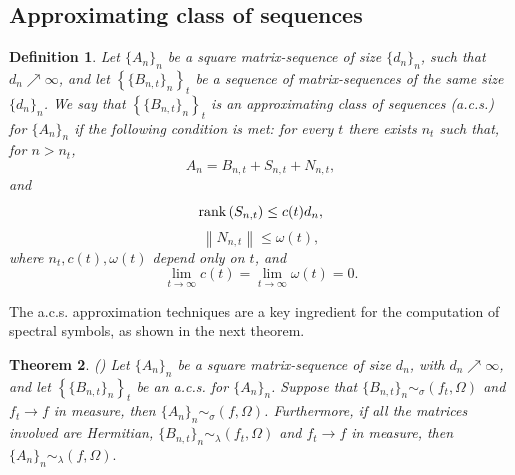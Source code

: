 \documentclass{amsart}
\newtheorem{thm}{Theorem}[section]
\newtheorem{defn}[thm]{Definition}
\begin{document}
\subsection{Approximating class of sequences}

\begin{defn}\label{def_acs}
Let $\{A_{n}\}_n$ be a square matrix-sequence of size $\{d_n\}_n$, such that $ d_n \nearrow \infty $, and let $\left\{\{B_{n,t}\}_n\right\}_{t}$ be a sequence of matrix-sequences of the same size $\{d_n\}_n$. We say that $\left\{\{B_{n,t}\}_n\right\}_{t}$ is an approximating class of sequences (a.c.s.) for $\{A_{n}\}_n$ %
if the following condition is met: for every $t$ there exists $n_t$ such that, for $n>n_t$,
\begin{equation*} \nonumber
A_n =  B_{n,t} + S_{n,t} + N_{n,t},
\end{equation*}
and
\begin{equation*}
    \textnormal{rank}\left(S_{n,t}\right) \leq c(t) d_n,
\end{equation*}
$$
\left\|N_{n,t}\right\|\leq \omega(t),
$$
where $n_t, c(t), \omega(t)$ depend only on $t$, and
$$
\lim_{t \to \infty} c(t) = \lim_{t \to \infty} \omega(t) =0.
$$
\end{defn}

The a.c.s. approximation techniques are a key ingredient for the computation of spectral symbols, as shown in the next theorem.

 \begin{thm}
 \label{acs}\rm(\cite{acs-laa,Tilliloc})
 Let $\{A_n\}_n$ be a square matrix-sequence of size $d_n$, with $ d_n \nearrow \infty $, and let $\left\{ \{B_{n,t} \}_n \right\}_t$ be an a.c.s. for $ \{ A_n \}_n$. Suppose that $ \{ B_{n,t}\}_n \sim_{\sigma} (f_t, \Omega) $ and $ f_t \to f $ in measure, then $ \{ A_n \}_n \sim_{\sigma} (f, \Omega) $. Furthermore, if all the matrices involved are Hermitian, $ \{B_{n,t} \}_n \sim_{\lambda} (f_t, \Omega) $ and $ f_t \to f $ in measure, then $ \{ A_n \}_n \sim_{\lambda} (f,\Omega). $
\end{thm}
\end{document}
